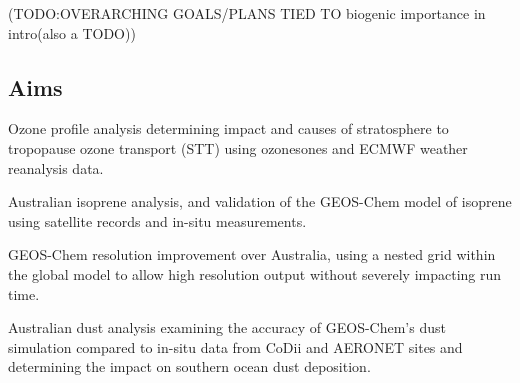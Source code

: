 (TODO:OVERARCHING GOALS/PLANS
TIED TO biogenic importance in intro(also a TODO))

\subsection{Aims}
\begin{list}
\item Ozone profile analysis determining impact and causes of stratosphere to tropopause ozone transport (STT) using ozonesones and ECMWF weather reanalysis data.
\item Australian isoprene analysis, and validation of the GEOS-Chem model of isoprene using satellite records and in-situ measurements.
\item GEOS-Chem resolution improvement over Australia, using a nested grid within the global model to allow high resolution output without severely impacting run time.
\item Australian dust analysis examining the accuracy of GEOS-Chem's dust simulation compared to in-situ data from CoDii and AERONET sites and determining the impact on southern ocean dust deposition.
\end{list}